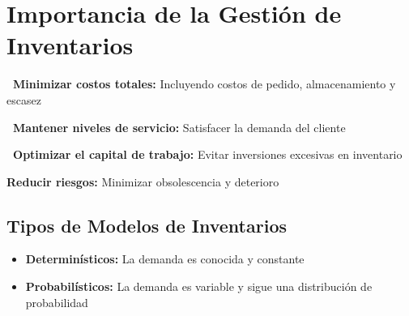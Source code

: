 \documentclass[12pt,a4paper]{book}
\begin{document}
	\section{Importancia de la Gestión de Inventarios}
	
	\begin{multicols}{2}
		\begin{tcolorbox}[colback=verdeclaro,colframe=verdeprincipal,boxrule=1pt,arc=5pt]
			\textbf{\faCheckCircle\ Minimizar costos totales:} Incluyendo costos de pedido, almacenamiento y escasez
		\end{tcolorbox}
		
		\begin{tcolorbox}[colback=azulclaro,colframe=azulprincipal,boxrule=1pt,arc=5pt]
			\textbf{\faUsers\ Mantener niveles de servicio:} Satisfacer la demanda del cliente
		\end{tcolorbox}
		
		\begin{tcolorbox}[colback=violetaclaro,colframe=moradoacento,boxrule=1pt,arc=5pt]
			\textbf{\faDollarSign\ Optimizar el capital de trabajo:} Evitar inversiones excesivas en inventario
		\end{tcolorbox}
		
		\begin{tcolorbox}[colback=naranjaclaro,colframe=naranjaacento,boxrule=1pt,arc=5pt]
			\textbf{Reducir riesgos:} Minimizar obsolescencia y deterioro
		\end{tcolorbox}
	\end{multicols}
	
	\subsection{Tipos de Modelos de Inventarios}
	
	\begin{tcolorbox}[enhanced,colback=grisclaro,colframe=azulprincipal,boxrule=2pt,arc=8pt,
		drop shadow,title={\bfseries\color{white} \faChartPie\ CLASIFICACIÓN POR PATRÓN DE DEMANDA}]
		
		\begin{itemize}[leftmargin=*,label=\textcolor{verdeprincipal}{\faArrowRight}]
			\item \textbf{\color{azulprincipal}Determinísticos:} La demanda es conocida y constante
			\item \textbf{\color{rojoacento}Probabilísticos:} La demanda es variable y sigue una distribución de probabilidad
		\end{itemize}
		
	\end{tcolorbox}
	
\end{document}
